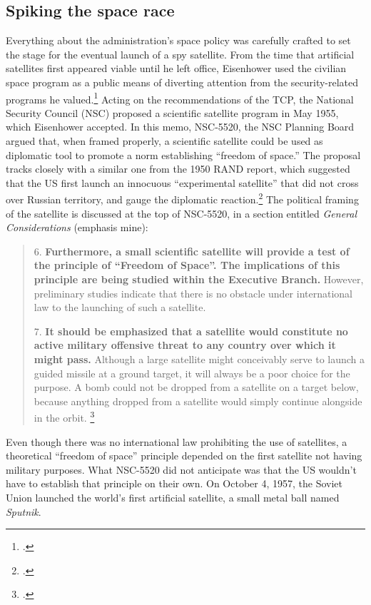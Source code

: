 \documentclass{memoir}
\begin{document}
\subsection{Spiking the space race}
Everything about the administration's space policy was carefully crafted to set the stage for the eventual launch of a spy satellite. From the time that artificial satellites first appeared viable until he left office, Eisenhower used the civilian space program as a public means of diverting attention from the security-related programs he valued.\footcite[p.~119]{day_eye_2015} Acting on the recommendations of the TCP, the National Security Council (NSC) proposed a scientific satellite program in May 1955, which Eisenhower accepted. In this memo, NSC-5520, the NSC Planning Board argued that, when framed properly, a scientific satellite could be used as diplomatic tool to promote a norm establishing ``freedom of space.'' The proposal tracks closely with a similar one from the 1950 RAND report, which suggested that the US first launch an innocuous ``experimental satellite'' that did not cross over Russian territory, and gauge the diplomatic reaction.\footcite[p.~21]{kecskemetic_satellite_1950} The political framing of the satellite is discussed at the top of NSC-5520, in a section entitled \emph{General Considerations} (emphasis mine):

\begin{quote}
	6. \textelp{} \textbf{Furthermore, a small scientific satellite will provide a test of the principle of “Freedom of Space”. The implications of this principle are being studied within the Executive Branch.} However, preliminary studies indicate that there is no obstacle under international law to the launching of such a satellite.

	7. \textbf{It should be emphasized that a satellite would constitute no active military offensive threat to any country over which it might pass.} Although a large satellite might conceivably serve to launch a guided missile at a ground target, it will always be a poor choice for the purpose. A bomb could not be dropped from a satellite on a target below, because anything dropped from a satellite would simply continue alongside in the orbit. \footcite{nsc_planning_board_draft_1955}
\end{quote}
Even though there was no international law prohibiting the use of satellites, a theoretical ``freedom of space'' principle depended on the first satellite not having military purposes. What NSC-5520 did not anticipate was that the US wouldn't have to establish that principle on their own. On October 4, 1957, the Soviet Union launched the world's first artificial satellite, a small metal ball named \emph{Sputnik}.
\end{document}
